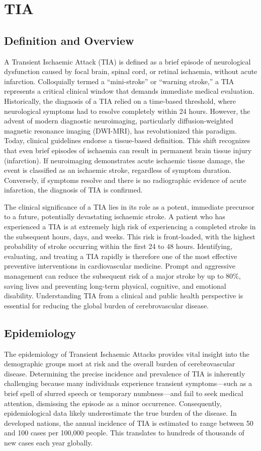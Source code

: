 \chapter{TIA}

\section*{Definition and Overview}
A Transient Ischaemic Attack (TIA) is defined as a brief episode of neurological dysfunction caused by focal brain, spinal cord, or retinal ischaemia, without acute infarction. Colloquially termed a ``mini-stroke'' or ``warning stroke,'' a TIA represents a critical clinical window that demands immediate medical evaluation. Historically, the diagnosis of a TIA relied on a time-based threshold, where neurological symptoms had to resolve completely within 24 hours. However, the advent of modern diagnostic neuroimaging, particularly diffusion-weighted magnetic resonance imaging (DWI-MRI), has revolutionized this paradigm. Today, clinical guidelines endorse a tissue-based definition. This shift recognizes that even brief episodes of ischaemia can result in permanent brain tissue injury (infarction). If neuroimaging demonstrates acute ischaemic tissue damage, the event is classified as an ischaemic stroke, regardless of symptom duration. Conversely, if symptoms resolve and there is no radiographic evidence of acute infarction, the diagnosis of TIA is confirmed.

The clinical significance of a TIA lies in its role as a potent, immediate precursor to a future, potentially devastating ischaemic stroke. A patient who has experienced a TIA is at extremely high risk of experiencing a completed stroke in the subsequent hours, days, and weeks. This risk is front-loaded, with the highest probability of stroke occurring within the first 24 to 48 hours. Identifying, evaluating, and treating a TIA rapidly is therefore one of the most effective preventive interventions in cardiovascular medicine. Prompt and aggressive management can reduce the subsequent risk of a major stroke by up to 80\%, saving lives and preventing long-term physical, cognitive, and emotional disability. Understanding TIA from a clinical and public health perspective is essential for reducing the global burden of cerebrovascular disease.

\section*{Epidemiology}
The epidemiology of Transient Ischaemic Attacks provides vital insight into the demographic groups most at risk and the overall burden of cerebrovascular disease. Determining the precise incidence and prevalence of TIA is inherently challenging because many individuals experience transient symptoms---such as a brief spell of slurred speech or temporary numbness---and fail to seek medical attention, dismissing the episode as a minor occurrence. Consequently, epidemiological data likely underestimate the true burden of the disease. In developed nations, the annual incidence of TIA is estimated to range between 50 and 100 cases per 100,000 people. This translates to hundreds of thousands of new cases each year globally.


